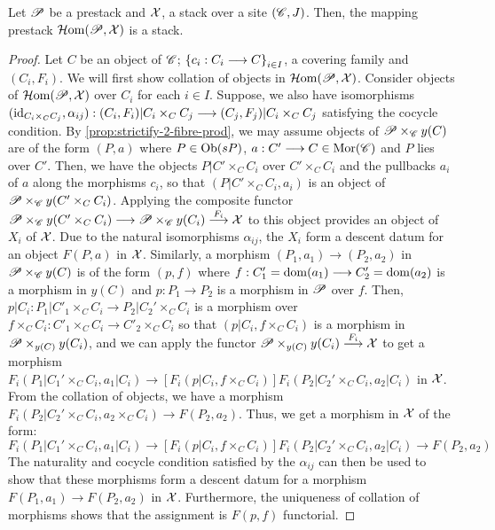 \documentclass[11pt]{amsart}
\begin{document}
\begin{prop}\label{prop:mapping-prest-st}
Let $\mathscr{P}$ be a prestack and $\mathcal{X}$, a stack over a site $(\mathscr{C}, J)$. Then,
the mapping prestack $\mathcal{H}\mathrm{om}(\mathscr{P}, \mathcal{X})$ is a stack.
\end{prop}
\begin{proof}
Let $C$ be an object of $\mathscr{C}$; $\set{c_i : C_i \to C}_{i \in I}$, a covering family and
$(C_i, F_i)$. We will first show collation of objects in $\mathcal{H}\mathrm{om}(\mathscr{P}, \mathcal{X})$.
Consider objects of $\mathcal{H}\mathrm{om}(\mathscr{P}, \mathcal{X})$ over $C_i$ for each $i \in I$.
Suppose, we also have isomorphisms
$(\id_{C_i \times_C C_j}, \alpha_{ij}) : (C_i, F_i)|C_i \times_C C_j
\to (C_j, F_j)|C_i \times_C C_j$ satisfying the cocycle condition.
By \cref{prop:strictify-2-fibre-prod}, we may assume objects of $\mathscr{P} \times_{\mathscr{C}} y(C)$
are of the form $(P, a)$ where $P \in \Ob{sP}$, $a : C' \to C \in \Mor{\sC}$
and $P$ lies over $C'$. Then, we have the objects $P|C' \times_C C_i$ over $C' \times_C C_i$
and the pullbacks $a_i$ of $a$ along the morphisms $c_i$,
so that $(P|C' \times_C C_i, a_i)$ is an object of $\mathscr{P} \times_\mathscr{C} y(C' \times_C C_i)$.
Applying the composite functor
$\sP \times_\sC y(C' \times_C C_i) \to \sP \times_\sC y(C_i) \to[F_i] \mcX$
to this object provides an object of $X_i$ of $\mathcal{X}$. Due to the natural isomorphisms
$\alpha_{ij}$, the $X_i$ form a descent datum for an object $F(P, a)$ in $\mathcal{X}$.
Similarly, a morphism $(P_1, a_1) \to (P_2, a_2)$ in $\mathscr{P} \times_\mathscr{C} y(C)$ is of the form
$(p, f)$ where $f : C'_1 = \dom(a_1) \to C'_2 = \dom(a_2)$ is a morphism in $y(C)$
and $p : P_1 \to P_2$ is a morphism in $\mathscr{P}$ over $f$. Then,
$p|C_i : P_1|C'_1 \times_C C_i \to P_2|C_2' \times_C C_i$ is a morphism over
$f \times_C C_i : C'_1 \times_C C_i \to C'_2 \times_C C_i$ so that $(p|C_i, f \times_C C_i)$
is a morphism in $\mathscr{P} \times_{y(C)} y(C_i)$, and we can apply the functor
$\sP \times_{y(C)} y(C_i) \to[F_i] \mcX$ to get a morphism
$F_i(P_1|C_1' \times_C C_i, a_1|C_i)
\to[F_i(p|C_i, f \times_C C_i)] F_i(P_2|C_2' \times_C C_i, a_2|C_i)$ in $\mathcal{X}$.
From the collation of objects, we have a morphism
$F_i(P_2|C_2' \times_C C_i, a_2 \times_C C_i) \to F(P_2, a_2)$.
Thus, we get a morphism in $\mathcal{X}$ of the form:
\[
F_i(P_1|C_1' \times_C C_i, a_1|C_i)
    \to[F_i(p|C_i, f \times_C C_i)] F_i(P_2|C_2' \times_C C_i, a_2|C_i)
    \to F(P_2, a_2)
\]
The naturality and cocycle condition satisfied by the $\alpha_{ij}$ can then be used to
show that these morphisms form a descent datum for a morphism $F(P_1, a_1) \to F(P_2, a_2)$ in
$\mathcal{X}$. Furthermore, the uniqueness of collation of morphisms shows that the assignment is
$F(p, f)$ functorial.


\end{proof}
\end{document}
